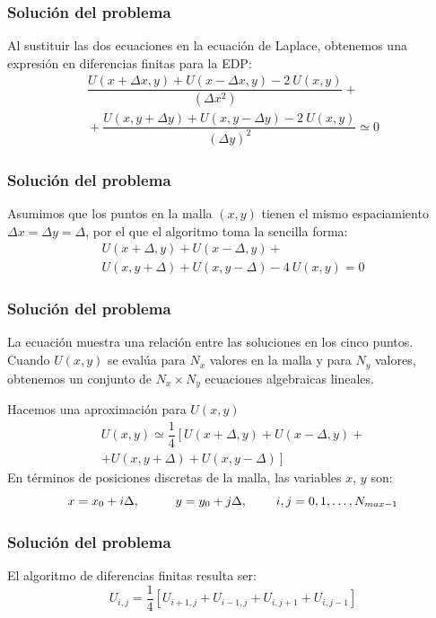 \begin{frame}
\frametitle{Solución del problema}
Al sustituir las dos ecuaciones en la ecuación de Laplace, obtenemos una expresión en diferencias finitas para la EDP:
\fontsize{12}{12}\selectfont
\begin{align*}
\dfrac{U(x+\Delta x,y) + U(x-\Delta x, y) - 2 \: U(x,y)}{(\Delta x^{2})} + {} \\
{} + \dfrac{U(x,y+\Delta y) + U(x,y-\Delta y) - 2 \: U(x,y)}{(\Delta y)^{2}} \simeq 0
\end{align*}
\end{frame}
\begin{frame}
\frametitle{Solución del problema}
Asumimos que los puntos en la malla $(x,y)$ tienen el mismo espaciamiento $\Delta x =  \Delta y = \Delta$, por el que el algoritmo toma la sencilla forma:
\begin{align*}
U(x + \Delta, y) + U(x-\Delta, y) + {} \\
U(x,y +\Delta)  + U(x,y - \Delta) - 4 \: U(x,y)= 0
\end{align*}
\end{frame}
\begin{frame}
\frametitle{Solución del problema}
La ecuación muestra una relación entre las soluciones en los cinco puntos.
\\
\bigskip
Cuando $U(x,y)$ se evalúa para $N_{x}$ valores en la malla y para $N_{y}$ valores, obtenemos un conjunto de $N_{x} \times N_{y}$ ecuaciones algebraicas lineales.
\end{frame}
\begin{frame}
Hacemos una aproximación para $U(x,y)$
\begin{eqnarray*}
U(x,y) \simeq	\dfrac{1}{4} \left[ U(x+\Delta ,y) + U(x-\Delta,y) + \right. \\
\left. + U(x,y+\Delta) + U(x,y-\Delta) \right]
\end{eqnarray*}
En términos de posiciones discretas de la malla, las variables $x$, $y$ son:
\[ x = x_{0} + i \Delta, \hspace{1cm} y = y_{0}+ j \Delta, \hspace{0.8cm} i,j = 0,1,\ldots,N_{max-1} \]
\end{frame}
\begin{frame}
\frametitle{Solución del problema}
El algoritmo de diferencias finitas resulta ser:
\[ U_{i,j} = \dfrac{1}{4} [U_{i+1,j} + U_{i-1,j} + U_{i,j+1} + U_{i,j-1}] \]
\begin{figure}
	\centering
	
\end{figure}
\end{frame}
